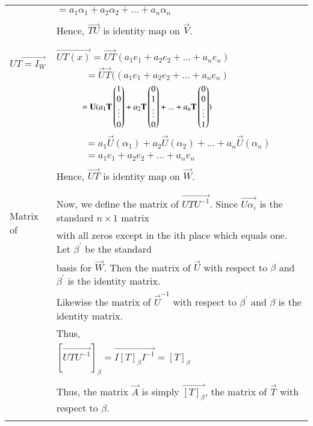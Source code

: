 \begin{table*}[!ht]
{\begin{tabular}{|l|l|}
		& \qquad \quad $= a_1\alpha_{1} + a_2\alpha_{2} + ... + a_n\alpha_{n}$\\
		& \\
		& Hence, $\vec{TU}$ is identity map on $\vec{V}$.\\
		& \\
		\hline	
		\multirow{3}{*}{$\vec{UT=I_W}$} & \\
		& $\vec{UT(x)}  = \vec{UT}(a_1e_1 + a_2e_2 + ... + a_ne_n)$ \qquad \qquad \qquad \qquad \qquad \qquad \qquad \qquad \qquad \qquad \\
		& $ \qquad \quad = \vec{U}\vec{T}((a_1e_1 + a_2e_2 + ... + a_ne_n)$ \\
		& $ \qquad \quad = \mathbf{U}(a_1\mathbf{T}\begin{pmatrix}1 \\ 0 \\ \vdots \\ 0 \end{pmatrix} + a_2\mathbf{T}\begin{pmatrix}0 \\ 1 \\ \vdots \\ 0 \end{pmatrix} + ... + a_n\mathbf{T}\begin{pmatrix}0 \\ 0 \\ \vdots \\ 1 \end{pmatrix}) $\\
		& $ \qquad \quad = a_1\vec{U}(\alpha_{1}) + a_2\vec{U}(\alpha_{2}) + ... + a_n\vec{U}(\alpha_{n})$ \\
		& $ \qquad \quad = a_1e_1 + a_2e_2 + ... + a_ne_n$ \\
		&\\
		& Hence, $\vec{UT}$ is identity map on $\vec{W}$. \\
		& \\
		\hline	
		\multirow{3}{*}{Matrix of} & \\
		& Now, we define the matrix of $\vec{UTU^{-1}}$. Since $\vec{U\alpha_{i}}$ is the standard $n \times 1$ matrix  \quad \\
		\quad	$\vec{UTU^{-1}}$ & with all zeros except in the ith place which equals one. Let $\beta^{'}$ be the standard \\
		& basis for $\vec{W}$. Then the matrix of $\vec{U}$ with respect to $\beta$ and $\beta^{'}$ is the      identity matrix. \\
		& Likewise the matrix of $\vec{U}^{-1}$ with respect to $\beta^{'}$ and $\beta$ is the identity matrix. \\
		& Thus,\\
		& \qquad \qquad \qquad $[\vec{UTU^{-1}}]_\beta = \vec{I[T]_\beta I^{-1}} = [T]_\beta$\\
		& \\
		& Thus, the matrix $\vec{A}$ is simply $\vec{[T]_\beta}$, the matrix of $\vec{T}$ with respect to $\beta$.\\
		& \\
		\hline			
	\end{tabular}
}
\caption{}
\label{eq:solutions/3/4/11/table:2}
\end{table*}
